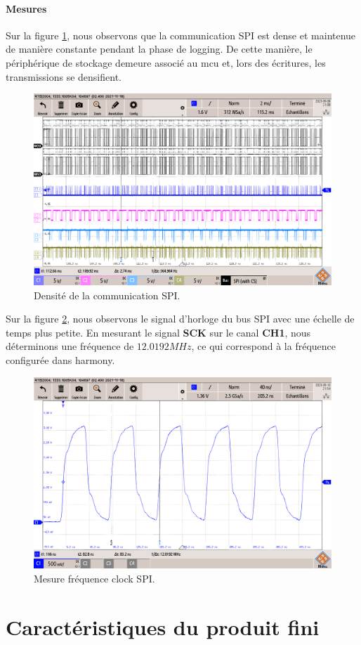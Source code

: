 \clearpage

\paragraph{Mesures} Sur la figure \ref{fig:densite-comm}, nous observons que la communication SPI est dense et maintenue de manière constante pendant la phase de logging. De cette manière, le périphérique de stockage demeure associé au \gls{mcu} et, lors des écritures, les transmissions se densifient.

\begin{figure}[H]
	\centering
	\includegraphics[width=0.7\linewidth]{../figures/mesures/SPI/densite-comm}
	\caption{Densité de la communication SPI.}
	\label{fig:densite-comm}
\end{figure}

Sur la figure \ref{fig:freq-spi}, nous observons le signal d'horloge du bus SPI avec une échelle de temps plus petite. En mesurant le signal \textbf{SCK} sur le canal \textbf{CH1}, nous déterminons une fréquence de \underline{$12.0192MHz$}, ce qui correspond à la fréquence configurée dans \gls{harmony}.

\begin{figure}[H]
	\centering
	\includegraphics[width=0.7\linewidth]{../figures/mesures/SPI/freq-spi-12}
	\caption{Mesure fréquence clock SPI.}
	\label{fig:freq-spi}
\end{figure}

\clearpage

\section{Caractéristiques du produit fini} \label{sec:Carac-finis}
